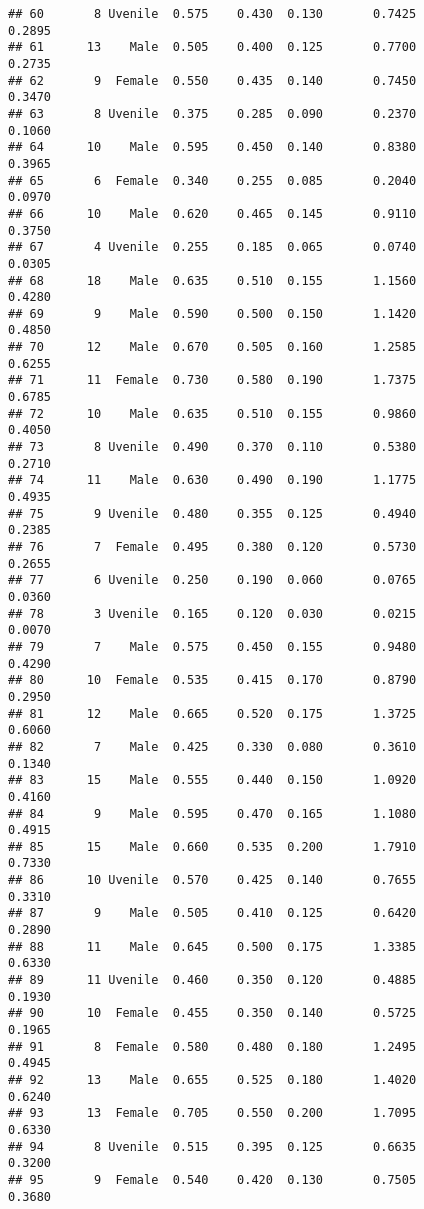 \documentclass[
]{article}
\begin{document}
\begin{verbatim}
## 60       8 Uvenile  0.575    0.430  0.130       0.7425         0.2895
## 61      13    Male  0.505    0.400  0.125       0.7700         0.2735
## 62       9  Female  0.550    0.435  0.140       0.7450         0.3470
## 63       8 Uvenile  0.375    0.285  0.090       0.2370         0.1060
## 64      10    Male  0.595    0.450  0.140       0.8380         0.3965
## 65       6  Female  0.340    0.255  0.085       0.2040         0.0970
## 66      10    Male  0.620    0.465  0.145       0.9110         0.3750
## 67       4 Uvenile  0.255    0.185  0.065       0.0740         0.0305
## 68      18    Male  0.635    0.510  0.155       1.1560         0.4280
## 69       9    Male  0.590    0.500  0.150       1.1420         0.4850
## 70      12    Male  0.670    0.505  0.160       1.2585         0.6255
## 71      11  Female  0.730    0.580  0.190       1.7375         0.6785
## 72      10    Male  0.635    0.510  0.155       0.9860         0.4050
## 73       8 Uvenile  0.490    0.370  0.110       0.5380         0.2710
## 74      11    Male  0.630    0.490  0.190       1.1775         0.4935
## 75       9 Uvenile  0.480    0.355  0.125       0.4940         0.2385
## 76       7  Female  0.495    0.380  0.120       0.5730         0.2655
## 77       6 Uvenile  0.250    0.190  0.060       0.0765         0.0360
## 78       3 Uvenile  0.165    0.120  0.030       0.0215         0.0070
## 79       7    Male  0.575    0.450  0.155       0.9480         0.4290
## 80      10  Female  0.535    0.415  0.170       0.8790         0.2950
## 81      12    Male  0.665    0.520  0.175       1.3725         0.6060
## 82       7    Male  0.425    0.330  0.080       0.3610         0.1340
## 83      15    Male  0.555    0.440  0.150       1.0920         0.4160
## 84       9    Male  0.595    0.470  0.165       1.1080         0.4915
## 85      15    Male  0.660    0.535  0.200       1.7910         0.7330
## 86      10 Uvenile  0.570    0.425  0.140       0.7655         0.3310
## 87       9    Male  0.505    0.410  0.125       0.6420         0.2890
## 88      11    Male  0.645    0.500  0.175       1.3385         0.6330
## 89      11 Uvenile  0.460    0.350  0.120       0.4885         0.1930
## 90      10  Female  0.455    0.350  0.140       0.5725         0.1965
## 91       8  Female  0.580    0.480  0.180       1.2495         0.4945
## 92      13    Male  0.655    0.525  0.180       1.4020         0.6240
## 93      13  Female  0.705    0.550  0.200       1.7095         0.6330
## 94       8 Uvenile  0.515    0.395  0.125       0.6635         0.3200
## 95       9  Female  0.540    0.420  0.130       0.7505         0.3680

\end{verbatim}
\end{document}
